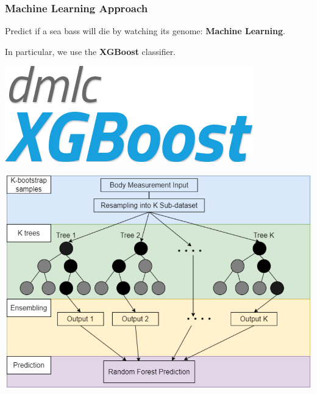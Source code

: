 \documentclass[aspectratio=169]{beamer}
\begin{document}
\begin{frame}
\frametitle{Machine Learning Approach}

\begin{minipage}[c]{0.5\textwidth}
  Predict if a sea bass will die by watching its genome: \textbf{Machine Learning}.

\vspace{1.5cm}

  In particular, we use the \textbf{XGBoost} classifier.
\end{minipage}
\begin{minipage}[c]{0.04\textwidth}
  \hfill
\end{minipage}
\begin{minipage}[c]{0.42\textwidth}
  \includegraphics[width=0.4\linewidth]{figures/xgboost-logo.png}

  \vspace{0.6cm}

  \includegraphics[width=\linewidth]{figures/xggoost.png}
\end{minipage}
\end{frame}
\end{document}

